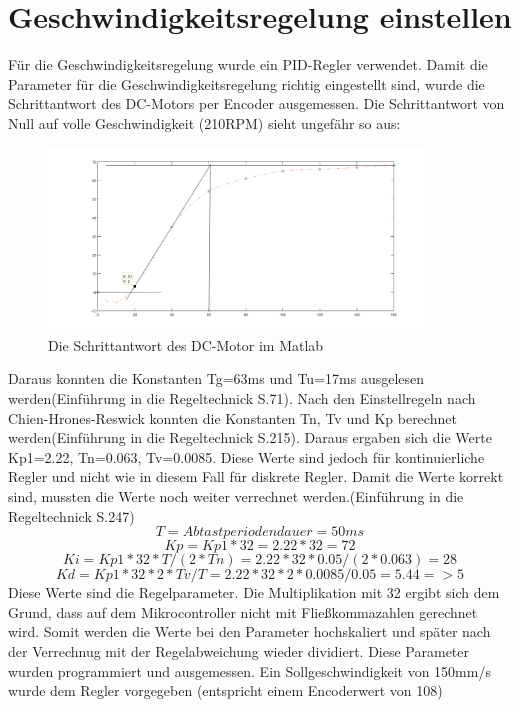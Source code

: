 \documentclass[a4paper, 10pt, fleqn]{article}
\begin{document}
\section{Geschwindigkeitsregelung einstellen}
Für die Geschwindigkeitsregelung wurde ein PID-Regler verwendet. Damit die Parameter für die Geschwindigkeitsregelung richtig eingestellt sind, wurde die Schrittantwort des DC-Motors per Encoder ausgemessen. Die Schrittantwort von Null auf volle Geschwindigkeit (210RPM) sieht ungefähr so aus:
\begin{figure}[H]%
\centering
\includegraphics[width=0.9\textwidth]{Images/Sprungantwort.png}
\caption{Die Schrittantwort des DC-Motor im Matlab}
\label{fig:schrittantwort}
\end{figure}
Daraus konnten die Konstanten Tg=63ms und Tu=17ms ausgelesen werden(Einführung in die Regeltechnick S.71). Nach den Einstellregeln nach Chien-Hrones-Reswick konnten die Konstanten Tn, Tv und Kp berechnet werden(Einführung in die Regeltechnick S.215). Daraus ergaben sich die Werte Kp1=2.22, Tn=0.063, Tv=0.0085.
Diese Werte sind jedoch für kontinuierliche Regler und nicht wie in diesem Fall für diskrete Regler. Damit die Werte korrekt sind, mussten die Werte noch weiter verrechnet werden.(Einführung in die Regeltechnick S.247)
\[ T=Abtastperiodendauer=50ms\]
\[ Kp=Kp1*32=2.22*32=72\]
\[ Ki=Kp1*32*T/(2*Tn)=2.22*32*0.05/(2*0.063)=28\]
\[ Kd=Kp1*32*2*Tv/T=2.22*32*2*0.0085/0.05=5.44 =>5\]
Diese Werte sind die Regelparameter. Die Multiplikation mit 32 ergibt sich dem Grund, dass auf dem Mikrocontroller nicht mit Fließkommazahlen gerechnet wird. Somit werden die Werte bei den Parameter hochskaliert und später nach der Verrechnug mit der Regelabweichung wieder dividiert.
Diese Parameter wurden programmiert und ausgemessen. Ein Sollgeschwindigkeit von 150mm/s wurde dem Regler vorgegeben (entspricht einem Encoderwert von 108)
\end{document}
